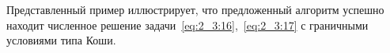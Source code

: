 Представленный пример иллюстрирует, что предложенный
алгоритм успешно находит численное решение
задачи~\eqref{eq:2_3:16},~\eqref{eq:2_3:17} с граничными
условиями типа Коши.


%


%
